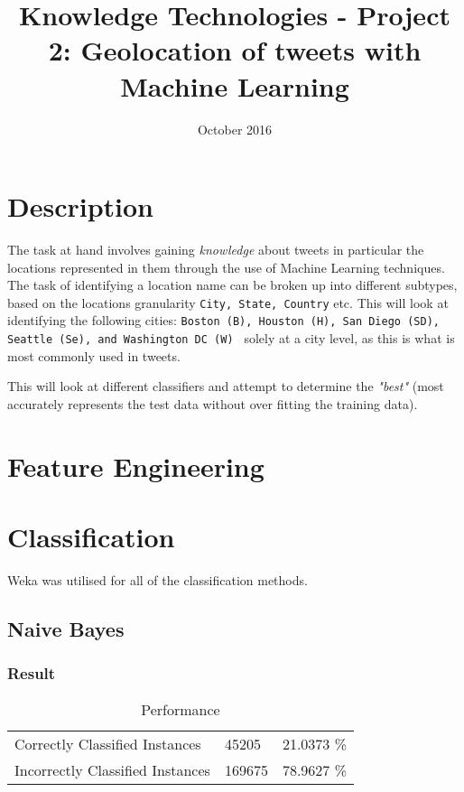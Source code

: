 \documentclass[a4paper]{article}
\title{Knowledge Technologies - Project 2: Geolocation of tweets with Machine Learning}
\date{October 2016}
\begin{document}
\maketitle

\section{Description}
The task at hand involves gaining \textit{knowledge} about tweets in particular the locations represented in them through the use of Machine Learning techniques.
The task of identifying a location name can be broken up into different subtypes, based on the locations granularity \texttt{City, State, Country} etc. \cite{nadeau2007survey} This will look at identifying the following cities: \texttt{Boston (B), Houston (H), San Diego (SD), Seattle (Se), and Washington DC (W) } solely at a city level, as this is what is most commonly used in tweets.

This will look at different classifiers and attempt to determine the \textit{"best"} (most accurately represents the test data without over fitting the training data).
\section{Feature Engineering}

\section{Classification}
Weka \cite{Weka} was utilised for all of the classification methods.


\subsection{Naive Bayes}
\subsubsection{Result}

\begin{table}[H]
\centering
\caption{Performance}
\label{my-label}
  \begin{tabular}{lll}
    Correctly Classified Instances & 45205 & 21.0373 \% \\
    Incorrectly Classified Instances & 169675 & 78.9627 \% \\
  \end{tabular}
\end{table}
\end{document}
